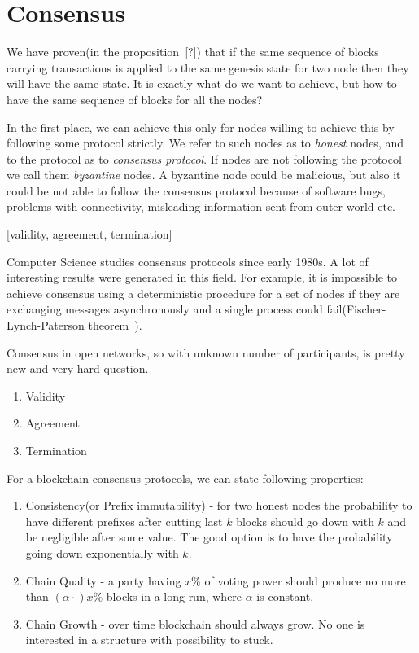 \documentclass[]{report}   %
\begin{document}
\section{Consensus}

We have proven(in the proposition~[?]) that if the same sequence of blocks carrying transactions is applied to the same genesis state for two node then they will have the same state. It is exactly what do we want to achieve, but how to have the same sequence of blocks for all the nodes? 

In the first place, we can achieve this only for nodes willing to achieve this by following some protocol strictly. We refer to such nodes as to \textit{honest} nodes, and to the protocol as to \textit{consensus protocol}. If nodes are not following the protocol we call them \textit{byzantine} nodes. A byzantine node could be malicious, but also it could be not able to follow the consensus protocol because of software bugs, problems with connectivity, misleading information sent from outer world etc. 

[validity, agreement, termination]

Computer Science studies consensus protocols since early 1980s. A lot of interesting results were generated in this field. For example, it is impossible to achieve consensus using a deterministic procedure for a set of nodes if they are exchanging messages asynchronously and a single process could fail(Fischer-Lynch-Paterson theorem~\cite{}). 

Consensus in open networks, so with unknown number of participants, is pretty new and very hard question. 

\begin{enumerate}
\item{Validity}
\item{Agreement}
\item{Termination}
\end{enumerate}

For a blockchain consensus protocols, we can state following properties:

\begin{enumerate}
\item{Consistency(or Prefix immutability)} - for two honest nodes the probability to have different prefixes after cutting last \(k\) blocks should go down with \(k\) and be negligible after some value. The good option is to have the probability going down exponentially with \(k\).
\item{Chain Quality} - a party having \(x\%\) of voting power should produce no more than \((\alpha \cdot) x \%\) blocks in a long run, where \(\alpha\) is constant.
\item{Chain Growth} - over time blockchain should always grow. No one is interested in a structure with possibility to stuck. 
\end{enumerate}
\end{document}
